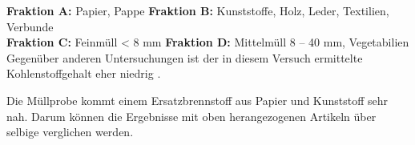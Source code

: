 \begin{table}[h!]
	\centering
	\caption[Elementgehalte von Restabfall und ausgewählter Fraktionen]{Elementgehalte von Restabfall und ausgewählter Fraktionen \cite[S.11]{HansGunterRamke.}}
	\label{tab:tc_vergleich}
\end{table}
\FloatBarrier
{\footnotesize \textbf{Fraktion A:} Papier, Pappe \quad \quad \quad \hspace*{0.7mm} \textbf{Fraktion B:} Kunststoffe, Holz, Leder, Textilien, Verbunde}\\
{\footnotesize \textbf{Fraktion C:} Feinmüll < 8 mm \quad \quad \textbf{Fraktion D:} Mittelmüll 8 – 40 mm, Vegetabilien}\\

Gegenüber anderen Untersuchungen ist der in diesem Versuch ermittelte Kohlenstoffgehalt eher niedrig \cite[Abb.3]{Schwarzboeck2018}.

Die Müllprobe kommt einem Ersatzbrennstoff aus Papier und Kunststoff sehr nah. Darum können die Ergebnisse mit oben herangezogenen Artikeln über selbige verglichen werden. \\

